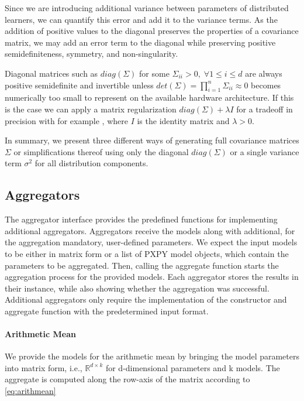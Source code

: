 Since we are introducing additional variance between parameters of distributed learners, we can quantify this error and add it to the variance terms.
As the addition of positive values to the diagonal preserves the properties of a covariance matrix, we may add an error term to the diagonal while preserving positive semidefiniteness, symmetry, and non-singularity.

Diagonal matrices such as $diag(\Sigma)$ for some $\Sigma_{ii} > 0, \; \forall 1 \leq i \leq d$ are always positive semidefinite and invertible unless $det(\Sigma) = \prod_{i=1}^n \Sigma_{ii} \approx 0$ becomes numerically too small to represent on the available hardware architecture. 
If this is the case we can apply a matrix regularization $diag(\Sigma) + \lambda I$ for a tradeoff in precision with for example , where $I$ is the identity matrix and $\lambda > 0$.

In summary, we present three different ways of generating full covariance matrices $\Sigma$ or simplifications thereof using only the diagonal $diag(\Sigma)$ or a single variance term $\sigma^2$ for all distribution components.
\subsection{Aggregators}

The aggregator interface provides the predefined functions for implementing additional aggregators.
Aggregators receive the models along with additional, for the aggregation mandatory, user-defined parameters.
We expect the input models to be either in matrix form or a list of PXPY model objects, which contain the parameters to be aggregated.
Then, calling the aggregate function starts the aggregation process for the provided models. 
Each aggregator stores the results in their instance, while also showing whether the aggregation was successful.
Additional aggregators only require the implementation of the constructor and aggregate function with the predetermined input format.

\paragraph*{Arithmetic Mean}
We provide the models for the arithmetic mean by bringing the model parameters into matrix form, i.e., $\mathbb{R}^{d \times k}$ for d-dimensional parameters and k models.
The aggregate is computed along the row-axis of the matrix according to \autoref{eq:arithmean}

